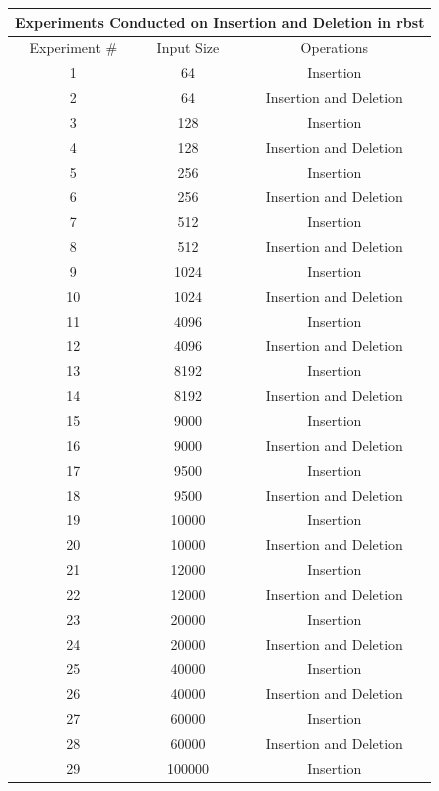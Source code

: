 \documentclass[12pt, a4paper]{article}
\begin{document}
 \begin{table}[H]
    \begin{tabular}{ |c|c|c| }
      \hline
      \multicolumn{3}{|c|}{Experiments Conducted on Insertion and Deletion in \acrshort{rbst}}\\
      \hline
      Experiment \# & Input Size & Operations \\
      \hline
      1 & 64 & Insertion \\
      2 & 64 & Insertion and Deletion \\
      3 & 128 & Insertion \\
      4 & 128 & Insertion and Deletion \\
      5 & 256 & Insertion \\
      6 & 256 & Insertion and Deletion \\
      7 & 512 & Insertion \\
      8 & 512 & Insertion and Deletion \\
      9 & 1024 & Insertion \\
      10 & 1024 & Insertion and Deletion \\
      11 & 4096 & Insertion \\
      12 & 4096 & Insertion and Deletion \\
      13 & 8192 & Insertion \\
      14 & 8192 & Insertion and Deletion \\
      15 & 9000 & Insertion \\
      16 & 9000 & Insertion and Deletion \\
      17 & 9500 & Insertion \\
      18 & 9500 & Insertion and Deletion \\
      19 & 10000 & Insertion \\
      20 & 10000 & Insertion and Deletion \\
      21 & 12000 & Insertion \\
      22 & 12000 & Insertion and Deletion \\
      23 & 20000 & Insertion \\
      24 & 20000 & Insertion and Deletion \\
      25 & 40000 & Insertion \\
      26 & 40000 & Insertion and Deletion \\
      27 & 60000 & Insertion \\
      28 & 60000 & Insertion and Deletion \\
      29 & 100000 & Insertion \\

\end{tabular}
\end{table}
\end{document}
